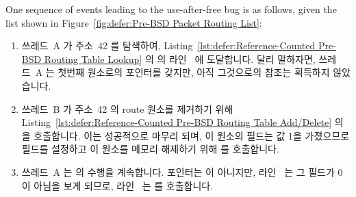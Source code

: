 One sequence of events leading to the use-after-free bug is as follows,
given the list shown in
Figure~\ref{fig:defer:Pre-BSD Packet Routing List}:

\fi

\begin{fcvref}
\begin{enumerate}
\item	쓰레드~A 가 주소~42 를 탐색하여,
	Listing~\ref{lst:defer:Reference-Counted Pre-BSD Routing Table Lookup}
	의  의 라인~ 에 도달합니다.
	달리 말하자면, 쓰레드~A 는 첫번째 원소로의 포인터를 갖지만, 아직
	그것으로의 참조는 획득하지 않았습니다.
\item	쓰레드~B 가 주소~42 의 route 원소를 제거하기 위해
	Listing~\ref{lst:defer:Reference-Counted Pre-BSD Routing Table Add/Delete}
	의  을 호출합니다.
	이는 성공적으로 마무리 되며, 이 원소의  필드는 값 1을
	가졌으므로  필드를 설정하고 이 원소를 메모리 해제하기
	위해  를 호출합니다.
\item	쓰레드~A 는  의 수행을 계속합니다.
	 포인터는  이 아니지만, 라인~
	는 그  필드가 0이 아님을 보게 되므로,
	라인~ 는  를 호출합니다.

\end{enumerate}
\end{fcvref}

